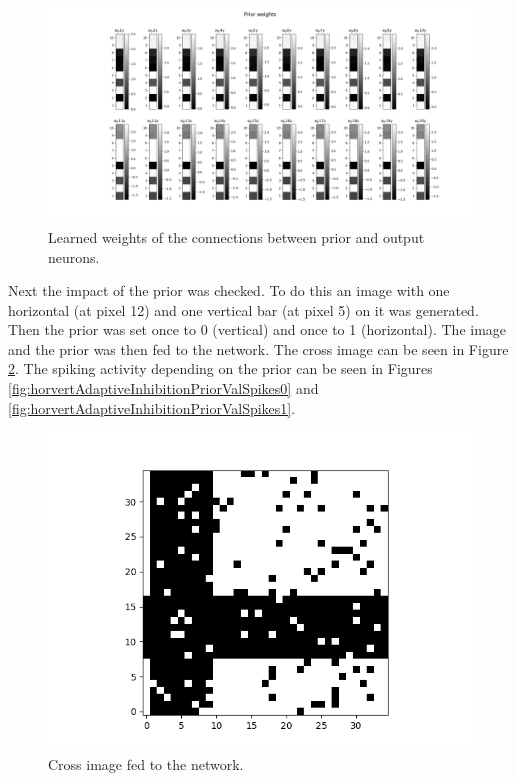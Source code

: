 \begin{figure}
  \includegraphics[width=\linewidth]{figures/horvertAdaptiveInh/priorWeights.png}
  \caption{ Learned weights of the connections between prior and output neurons. }
  \label{fig:horvertAdaptiveInhibitionpriorWeights}
\end{figure}

Next the impact of the prior was checked. To do this an image with one horizontal (at pixel 12) and one vertical bar (at pixel 5) on it was generated. Then the prior was set once to 0 (vertical) and once to 1 (horizontal). The image and the prior was then fed to the network. The cross image can be seen in Figure \ref{fig:horvertAdaptiveInhibitionPriorValImage}. The spiking activity depending on the prior can be seen in Figures \ref{fig:horvertAdaptiveInhibitionPriorValSpikes0} and \ref{fig:horvertAdaptiveInhibitionPriorValSpikes1}.

\begin{figure}
  \includegraphics[width=\linewidth]{figures/horvertAdaptiveInh/20priors_pos5and12/crossImage.png}
  \caption{ Cross image fed to the network. }
  \label{fig:horvertAdaptiveInhibitionPriorValImage}
\end{figure}

